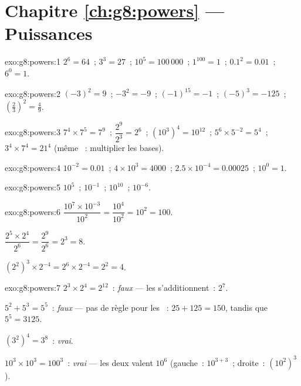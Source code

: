 \section*{Chapitre \ref{ch:g8:powers} --- Puissances}

\begin{solution}{exo:g8:powers:1}
$2^6 = 64$~; \quad $3^3 = 27$~; \quad $10^5 = 100\,000$~; \quad
$1^{100} = 1$~; \quad $0.1^2 = 0.01$~; \quad $6^0 = 1$.
\end{solution}

\begin{solution}{exo:g8:powers:2}
$(-3)^2 = 9$~; \quad $-3^2 = -9$~; \quad $(-1)^{15} = -1$~; \quad
$(-5)^3 = -125$~; \quad $\left(\frac23\right)^2 = \frac49$.
\end{solution}

\begin{solution}{exo:g8:powers:3}
$7^4 \times 7^5 = 7^9$~; \quad
$\dfrac{2^9}{2^3} = 2^6$~; \quad
$\left(10^3\right)^4 = 10^{12}$~; \quad
$5^6 \times 5^{-2} = 5^4$~; \quad
$3^4 \times 7^4 = 21^4$ (même ~: multiplier les bases).
\end{solution}

\begin{solution}{exo:g8:powers:4}
$10^{-2} = 0.01$~; \quad
$4 \times 10^3 = 4000$~; \quad
$2.5 \times 10^{-4} = 0.00025$~; \quad
$10^0 = 1$.
\end{solution}

\begin{solution}{exo:g8:powers:5}
$10^5$~; \quad $10^{-1}$~; \quad $10^{10}$~; \quad $10^{-6}$.
\end{solution}

\begin{solution}{exo:g8:powers:6}
$\dfrac{10^7 \times 10^{-3}}{10^2} = \dfrac{10^4}{10^2} = 10^2 =
100$.

$\dfrac{2^5 \times 2^4}{2^6} = \dfrac{2^9}{2^6} = 2^3 = 8$.

$\left(2^2\right)^3 \times 2^{-4} = 2^6 \times 2^{-4} = 2^2 = 4$.
\end{solution}

\begin{solution}{exo:g8:powers:7}
$2^3 \times 2^4 = 2^{12}$~: \emph{faux} --- les 
s'additionnent~: $2^7$.

$5^2 + 5^3 = 5^5$~: \emph{faux} --- pas de règle pour les ~:
$25 + 125 = 150$, tandis que $5^5 = 3125$.

$(3^2)^4 = 3^8$~: \emph{vrai}.

$10^3 \times 10^3 = 100^3$~: \emph{vrai} --- les deux valent $10^6$
(gauche~: $10^{3+3}$~; droite~: $(10^2)^3$).
\end{solution}

